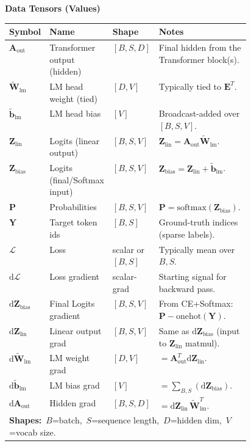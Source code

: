 \documentclass{article}
\begin{document}
\begin{center}
\textbf{Data Tensors (Values)}
\begin{tabular}{lllp{0.46\linewidth}}
\hline
\textbf{Symbol} & \textbf{Name} & \textbf{Shape} & \textbf{Notes} \\
\hline
$\mathbf{A}_{\text{out}}$ & Transformer output (hidden) & $[B,S,D]$ & Final hidden from the Transformer block(s). \\
$\widetilde{\mathbf{W}}_{\text{lm}}$ & LM head weight (tied) & $[D,V]$ & Typically tied to $\mathbf{E}^{T}$. \\
$\widetilde{\mathbf{b}}_{\text{lm}}$ & LM head bias           & $[V]$    & Broadcast-added over $[B,S,V]$. \\
$\mathbf{Z}_{\text{lin}}$ & Logits (linear output) & $[B,S,V]$ & $\mathbf{Z}_{\text{lin}}=\mathbf{A}_{\text{out}}\widetilde{\mathbf{W}}_{\text{lm}}$. \\
$\mathbf{Z}_{\text{bias}}$ & Logits (final/Softmax input) & $[B,S,V]$ & $\mathbf{Z}_{\text{bias}}=\mathbf{Z}_{\text{lin}}+\widetilde{\mathbf{b}}_{\text{lm}}$. \\
$\mathbf{P}$ & Probabilities                     & $[B,S,V]$ & $\mathbf{P}=\mathrm{softmax}(\mathbf{Z}_{\text{bias}})$. \\
$\mathbf{Y}$ & Target token ids                  & $[B,S]$   & Ground-truth indices (sparse labels). \\
$\mathcal{L}$ & Loss                              & scalar or $[B,S]$ & Typically mean over $B,S$. \\
$\mathrm{d}\mathcal{L}$ & Loss gradient          & scalar-grad & Starting signal for backward pass. \\
$\mathrm{d}\mathbf{Z}_{\text{bias}}$  & Final Logits gradient  & $[B,S,V]$  & From CE+Softmax: $\mathbf{P}-\text{onehot}(\mathbf{Y})$. \\
$\mathrm{d}\mathbf{Z}_{\text{lin}}$ & Linear output grad & $[B,S,V]$ & Same as $\mathrm{d}\mathbf{Z}_{\text{bias}}$ (input to $\mathbf{Z}_{\text{lin}}$ matmul). \\
$\mathrm{d}\widetilde{\mathbf{W}}_{\text{lm}}$ & LM weight grad & $[D,V]$ & $=\mathbf{A}_{\text{out}}^{T}\mathrm{d}\mathbf{Z}_{\text{lin}}$. \\
$\mathrm{d}\widetilde{\mathbf{b}}_{\text{lm}}$ & LM bias grad & $[V]$ & $=\sum_{B,S}(\mathrm{d}\mathbf{Z}_{\text{bias}})$. \\
$\mathrm{d}\mathbf{A}_{\text{out}}$ & Hidden grad & $[B,S,D]$  & $=\mathrm{d}\mathbf{Z}_{\text{lin}}\,\widetilde{\mathbf{W}}_{\text{lm}}^{T}$. \\
\hline
\multicolumn{4}{l}{\textbf{Shapes:}\ $B$=batch,\ $S$=sequence length,\ $D$=hidden dim,\ $V$=vocab size.} \\
\hline
\end{tabular}
\end{center}
\end{document}
